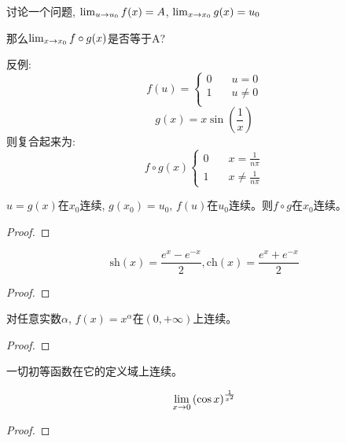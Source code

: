 \documentclass[lang=cn]{elegantbook}
\begin{document}
讨论一个问题, $\lim_{u \to u_0 } f(x) = A$, $\lim_{x \to x_0 } g(x) = u_0$

那么$\lim_{x \to x_0 } f\circ g(x)$是否等于A?

反例:
\begin{equation*}
    f(u) = \left\{
        \begin{aligned}
            0 & \quad u = 0 \\
            1 & \quad u \neq 0 \\
        \end{aligned}
    \right.
\end{equation*}
\begin{equation*}
    g(x) = x\sin\left(\frac{1}{x}\right)
\end{equation*}
则复合起来为:
\begin{equation*}
    f\circ g(x) \left\{
        \begin{aligned}
           0 & \quad x = \frac{1}{n\pi} \\
           1 & \quad x \neq \frac{1}{n\pi} 
        \end{aligned}
    \right.
\end{equation*}
\begin{theorem}
    $u = g(x)$在$x_0$连续, $g(x_0) = u_0$, $f(u)$在$u_0$连续。则$f\circ g$在$x_0$连续。
\end{theorem}
\begin{proof}
    
\end{proof}


\begin{proposition}
    \[ \mathrm{sh}(x) = \frac{e^x-e^{-x}}{2}, \mathrm{ch}(x) = \frac{e^x+e^{-x}}{2} \]
\end{proposition}
\begin{proof}
    
\end{proof}

\begin{proposition}
    对任意实数$\alpha$, $f(x) = x^\alpha$在$(0, +\infty)$上连续。
\end{proposition}
\begin{proof}
    
\end{proof}

\begin{theorem}
    一切初等函数在它的定义域上连续。
\end{theorem}

\begin{proposition}
    \[ \lim_{x \to 0 } \left(\cos x\right)^{\frac{1}{x^2}} \]
\end{proposition}
\begin{proof}
    
\end{proof}
\end{document}
